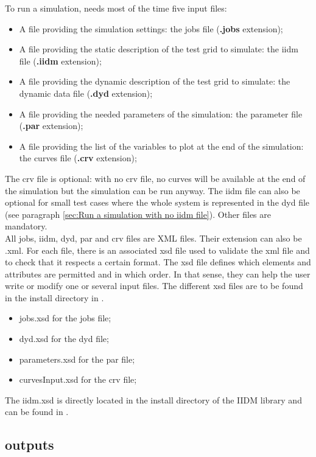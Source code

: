 \documentclass[a4paper, 12pt]{report}
\begin{document}
To run a simulation, \Dynawo needs most of the time five input files:
\begin{itemize}
\item A file providing the simulation settings: the jobs file (\textbf{.jobs} extension);
\item A file providing the static description of the test grid to simulate: the iidm file (\textbf{.iidm} extension);
\item A file providing the dynamic description of the test grid to simulate: the dynamic data file (\textbf{.dyd} extension);
\item A file providing the needed parameters of the simulation: the parameter file (\textbf{.par} extension);
\item A file providing the list of the variables to plot at the end of the simulation: the curves file (\textbf{.crv} extension);
\end{itemize}
The crv file is optional: with no crv file, no curves will be available at the end of the simulation but the simulation can be run anyway. The iidm file can also be optional for small test cases where the whole system is represented in the dyd file (see paragraph \ref{sec:Run a simulation with no iidm file}). Other files are mandatory. \\

All jobs, iidm, dyd, par and crv files are XML files. Their extension can also be .xml. For each file, there is an associated xsd file used to validate the xml file and to check that it respects a certain format. The xsd file defines which elements and attributes are permitted and in which order. In that sense, they can help the user write or modify one or several input files. The different xsd files are to be found in the install directory in .

\begin{itemize}
\item jobs.xsd for the jobs file;
\item dyd.xsd for the dyd file;
\item parameters.xsd for the par file;
\item curvesInput.xsd for the crv file;
\end{itemize}

The iidm.xsd is directly located in the install directory of the IIDM library and can be found in .

\subsection[Dynawo outputs]{\Dynawo outputs}
\end{document}
